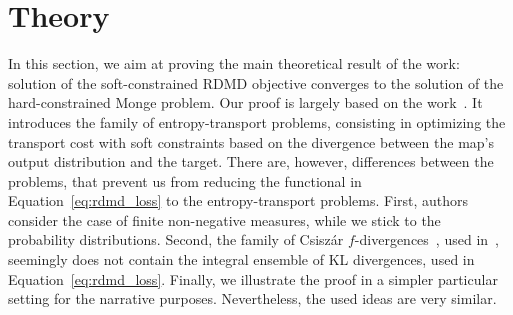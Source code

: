 \section{Theory}
\label{sec:theory}
In this section, we aim at proving the main theoretical result of the work: solution of the soft-constrained RDMD objective converges to the solution of the hard-constrained Monge problem. Our proof is largely based on the work~\cite{liero2018optimal}. It introduces the family of entropy-transport problems, consisting in optimizing the transport cost with soft constraints based on the divergence between the map's output distribution and the target. There are, however, differences between the problems, that prevent us from reducing the functional in Equation~\ref{eq:rdmd_loss} to the entropy-transport problems. First, authors consider the case of finite non-negative measures, while we stick to the probability distributions. Second, the family of Csisz{\'a}r $f$-divergences~\cite{csiszar1967information}, used in~\cite{liero2018optimal}, seemingly does not contain the integral ensemble of KL divergences, used in Equation~\ref{eq:rdmd_loss}. Finally, we illustrate the proof in a simpler particular setting for the narrative purposes. Nevertheless, the used ideas are very similar.

